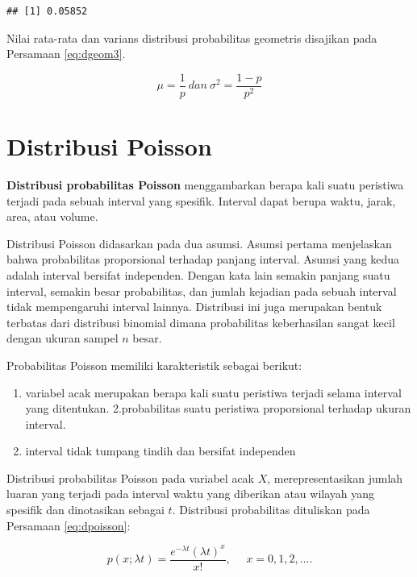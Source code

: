 \documentclass[]{book}
\providecommand{\tightlist}{%
  \setlength{\itemsep}{0pt}\setlength{\parskip}{0pt}}
\begin{document}
\begin{verbatim}
## [1] 0.05852
\end{verbatim}

Nilai rata-rata dan varians distribusi probabilitas geometris disajikan
pada Persamaan \eqref{eq:dgeom3}.

\begin{equation}
   \mu=\frac{1}{p}\ dan\ \sigma^2=\frac{1-p}{p^2}
  \label{eq:dgeom3}
\end{equation}

\section{Distribusi Poisson}\label{distribusi-poisson}

\textbf{Distribusi probabilitas Poisson} menggambarkan berapa kali suatu
peristiwa terjadi pada sebuah interval yang spesifik. Interval dapat
berupa waktu, jarak, area, atau volume.

Distribusi Poisson didasarkan pada dua asumsi. Asumsi pertama
menjelaskan bahwa probabilitas proporsional terhadap panjang interval.
Asumsi yang kedua adalah interval bersifat independen. Dengan kata lain
semakin panjang suatu interval, semakin besar probabilitas, dan jumlah
kejadian pada sebuah interval tidak mempengaruhi interval lainnya.
Distribusi ini juga merupakan bentuk terbatas dari distribusi binomial
dimana probabilitas keberhasilan sangat kecil dengan ukuran sampel \(n\)
besar.

Probabilitas Poisson memiliki karakteristik sebagai berikut:

\begin{enumerate}
\def\labelenumi{\arabic{enumi}.}
\tightlist
\item
  variabel acak merupakan berapa kali suatu peristiwa terjadi selama
  interval yang ditentukan. 2.probabilitas suatu peristiwa proporsional
  terhadap ukuran interval.
\item
  interval tidak tumpang tindih dan bersifat independen
\end{enumerate}

Distribusi probabilitas Poisson pada variabel acak \(X\),
merepresentasikan jumlah luaran yang terjadi pada interval waktu yang
diberikan atau wilayah yang spesifik dan dinotasikan sebagai \(t\).
Distribusi probabilitas dituliskan pada Persamaan \eqref{eq:dpoisson}:

\begin{equation}
   p\left(x;\lambda t\right)=\frac{e^{-\lambda t}\left(\lambda t\right)^x}{x!},\ \ \ \ \ \ x=0,1,2,....
  \label{eq:dpoisson}
\end{equation}
\end{document}
